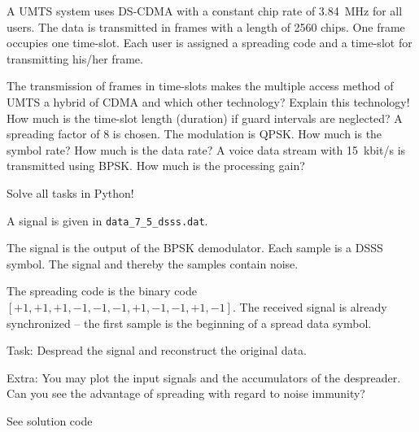 \begin{question}[subtitle={3G cell phone -- UMTS}]
	A UMTS system uses DS-CDMA with a constant chip rate of \SI{3.84}{MHz} for all users. The data is transmitted in frames with a length of 2560 chips. One frame occupies one time-slot. Each user is assigned a spreading code and a time-slot for transmitting his/her frame.
	
	\begin{tasks}
		\task
		The transmission of frames in time-slots makes the multiple access method of UMTS a hybrid of CDMA and which other technology? Explain this technology!
		\task
		How much is the time-slot length (duration) if guard intervals are neglected?
		\task
		A spreading factor of 8 is chosen. The modulation is QPSK. How much is the symbol rate? How much is the data rate?
		\task
		A voice data stream with \SI{15}{kbit/s} is transmitted using BPSK. How much is the processing gain?
	\end{tasks}
\end{question}

\begin{solution}
	\begin{tasks}
	\end{tasks}
\end{solution}

\begin{question}[subtitle={Python Programming: DSSS}]
	Solve all tasks in Python!
	
	A signal is given in \texttt{data\_7\_5\_dsss.dat}.
	
	The signal is the output of the BPSK demodulator. Each sample is a DSSS symbol. The signal and thereby the samples contain noise.
	
	The spreading code is the binary code $\left[+1, +1, +1, -1, -1, -1, +1, -1, -1, +1, -1\right]$. The received signal is already synchronized -- the first sample is the beginning of a spread data symbol.
	
	Task: Despread the signal and reconstruct the original data.
	
	Extra: You may plot the input signals and the accumulators of the despreader. Can you see the advantage of spreading with regard to noise immunity?
\end{question}

\begin{solution}
	See solution code
\end{solution}

